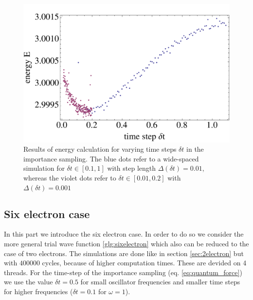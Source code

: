 \begin{figure}[htbp]
    \centering
    \includegraphics[scale=0.6]{importance}
    \caption{Results of energy calculation for varying time steps $\delta t$ in the importance sampling. The blue dots refer to a wide-spaced simulation for $\delta t \in [0.1,1]$ with step length $\Delta (\delta t) = 0.01$, whereas the violet dots refer to $\delta t\in [0.01,0.2]$ with $\Delta(\delta t) = 0.001$}
    \label{fig:importance}
\end{figure}
\FloatBarrier


\subsection{Six electron case}\label{sec:6electron}
In this part we introduce the six electron case. In order to do so we consider the more general trial wave function \ref{glg:sixelectron} which also can be reduced to the case of two electrons. The simulations are done like in section \ref{sec:2electron} but with $400000$ cycles, because of higher computation times. These are devided on 4 threads. For the time-step of the importance sampling (eq. \ref{eq:quantum_force}) we use the value $\delta t = 0.5$ for small oscillator frequencies and smaller time steps for higher frequencies ($\delta t = 0.1$ for $\omega = 1$). 

